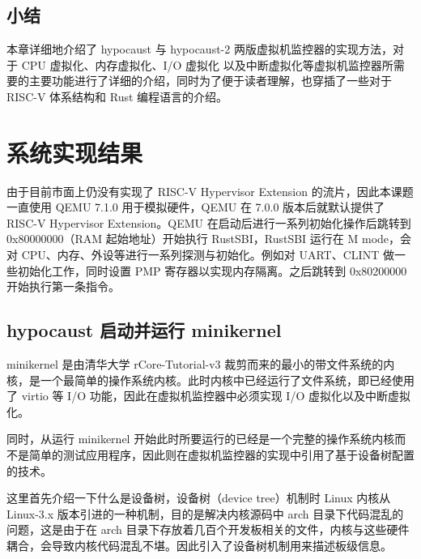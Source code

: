 \section{小结}

本章详细地介绍了 hypocaust 与 hypocaust-2 两版虚拟机监控器的实现方法，对于 CPU 虚拟化、内存虚拟化、I/O 虚拟化 
以及中断虚拟化等虚拟机监控器所需要的主要功能进行了详细的介绍，同时为了便于读者理解，也穿插了一些对于 RISC-V 体系结构和
Rust 编程语言的介绍。



\chapter{系统实现结果}
由于目前市面上仍没有实现了 RISC-V Hypervisor Extension 的流片，因此本课题一直使用 QEMU 7.1.0 用于模拟硬件，QEMU 在 7.0.0 版本后就默认提供了 RISC-V Hypervisor Extension。QEMU 在启动后进行一系列初始化操作后跳转到 0x80000000（RAM 起始地址）开始执行 RustSBI，RustSBI 运行在 M mode，会对 CPU、内存、外设等进行一系列探测与初始化。例如对 UART、CLINT 做一些初始化工作，同时设置 PMP 寄存器以实现内存隔离。之后跳转到 0x80200000 开始执行第一条指令。

\section{hypocaust 启动并运行 minikernel}
minikernel 是由清华大学 rCore-Tutorial-v3 裁剪而来的最小的带文件系统的内核，是一个最简单的操作系统内核。此时内核中已经运行了文件系统，即已经使用了 virtio 等 I/O 功能，因此在虚拟机监控器中必须实现 I/O 虚拟化以及中断虚拟化。

同时，从运行 minikernel 开始此时所要运行的已经是一个完整的操作系统内核而不是简单的测试应用程序，因此则在虚拟机监控器的实现中引用了基于设备树配置的技术。

这里首先介绍一下什么是设备树，设备树（device tree）机制时 Linux 内核从 Linux-3.x 版本引进的一种机制，目的是解决内核源码中 arch 目录下代码混乱的问题，这是由于在 arch 目录下存放着几百个开发板相关的文件，内核与这些硬件耦合，会导致内核代码混乱不堪。因此引入了设备树机制用来描述板级信息。


